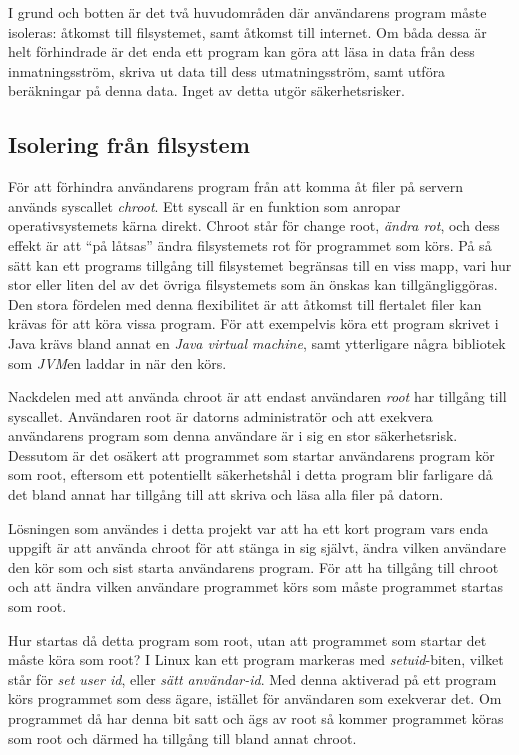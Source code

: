 \documentclass{article}
\begin{document}
I grund och botten är det två huvudområden där användarens program måste
isoleras: åtkomst till filsystemet, samt åtkomst till internet. Om båda dessa är
helt förhindrade är det enda ett program kan göra att läsa in data från dess
inmatningsström, skriva ut data till dess utmatningsström, samt utföra
beräkningar på denna data. Inget av detta utgör säkerhetsrisker.

\subsection{Isolering från filsystem}

För att förhindra användarens program från att komma åt filer på servern används
syscallet \textit{chroot}. Ett syscall är en funktion som anropar
operativsystemets kärna direkt. Chroot står för change root,
\textit{ändra rot}, och dess effekt är att ``på låtsas'' ändra filsystemets rot
för programmet som körs. På så sätt kan ett programs tillgång till filsystemet
begränsas till en viss mapp, vari hur stor eller liten del av det övriga
filsystemets som än önskas kan tillgängliggöras. Den stora fördelen med denna
flexibilitet är att åtkomst till flertalet filer kan krävas för att köra vissa
program. För att exempelvis köra ett program skrivet i Java krävs bland annat en
\textit{Java virtual machine}, samt ytterligare några bibliotek som
\textit{JVM}en laddar in när den körs.

Nackdelen med att använda chroot är att endast användaren \textit{root} har
tillgång till syscallet. Användaren root är datorns administratör och att
exekvera an\-vändarens program som denna användare är i sig en stor säkerhetsrisk.
Dessutom är det osäkert att programmet som startar användarens program kör som
root, eftersom ett potentiellt säkerhetshål i detta program blir farligare då
det bland annat har tillgång till att skriva och läsa alla filer på datorn.

Lösningen som användes i detta projekt var att ha ett kort program vars enda
uppgift är att använda chroot för att stänga in sig självt, ändra vilken
användare den kör som och sist starta användarens program. För att ha tillgång
till chroot och att ändra vilken användare programmet körs som måste programmet
startas som root.

Hur startas då detta program som root, utan att programmet som startar det måste
köra som root? I Linux kan ett program markeras med \textit{setuid}-biten,
vilket står för \textit{set user id}, eller \textit{sätt användar-id}. Med
denna aktiverad på ett program körs programmet som dess ägare, istället för
användaren som exekverar det. Om programmet då har denna bit satt och ägs av
root så kommer programmet köras som root och därmed ha tillgång till bland annat
chroot.
\end{document}
